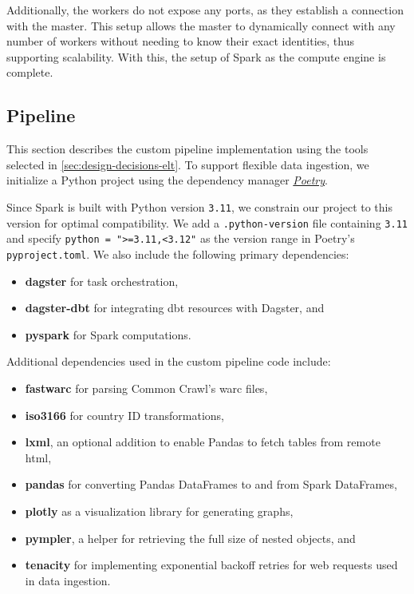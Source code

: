 Additionally, the workers do not expose any ports, as they establish a connection with the master.
This setup allows the master to dynamically connect with any number of workers without needing to know their exact identities, thus supporting scalability.
With this, the setup of Spark as the compute engine is complete.

\subsection{Pipeline}
\label{sec:implementation-pipeline}

This section describes the custom pipeline implementation using the tools selected in \cref{sec:design-decisions-elt}.
To support flexible data ingestion, we initialize a Python project using the dependency manager \href{https://python-poetry.org/}{\textit{Poetry}}.

Since Spark is built with Python version \texttt{3.11}, we constrain our project to this version for optimal compatibility.
We add a \texttt{.python-version} file containing \texttt{3.11} and specify \texttt{python = ">=3.11,<3.12"} as the version range in Poetry's \texttt{pyproject.toml}.
We also include the following primary dependencies:

\begin{itemize}
    \item \textbf{dagster} for task orchestration,
    \item \textbf{dagster-dbt} for integrating dbt resources with Dagster, and
    \item \textbf{pyspark} for Spark computations.
\end{itemize}

Additional dependencies used in the custom pipeline code include:

\begin{itemize}
    \item \textbf{fastwarc} for parsing Common Crawl's \ac{warc} files,
    \item \textbf{iso3166} for country ID transformations,
    \item \textbf{lxml}, an optional addition to enable Pandas to fetch tables from remote \ac{html},
    \item \textbf{pandas} for converting Pandas DataFrames to and from Spark DataFrames,
    \item \textbf{plotly} as a visualization library for generating graphs,
    \item \textbf{pympler}, a helper for retrieving the full size of nested objects, and
    \item \textbf{tenacity} for implementing exponential backoff retries for web requests used in data ingestion.
\end{itemize}

